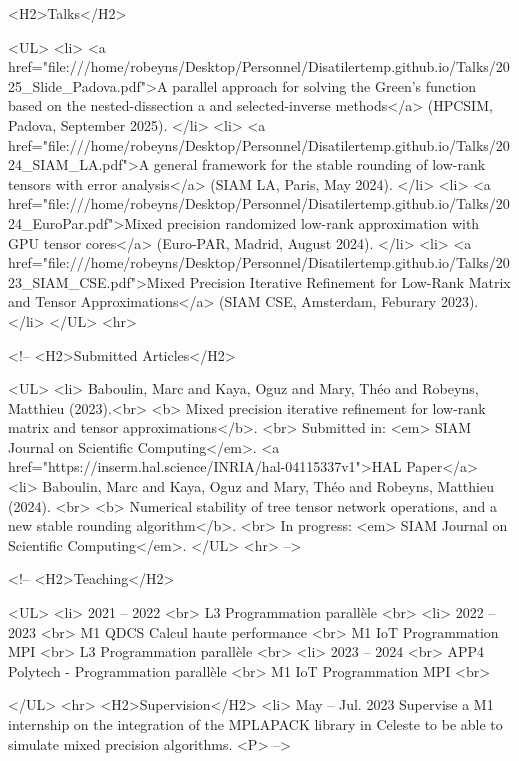                     <H2>Talks</H2>

                    <UL>
                        <li> <a href="file:///home/robeyns/Desktop/Personnel/Disatilertemp.github.io/Talks/2025_Slide_Padova.pdf">A parallel approach for solving the Green’s function based on the nested-dissection a and selected-inverse methods</a> (HPCSIM, Padova, September 2025). </li>
                        <li> <a href="file:///home/robeyns/Desktop/Personnel/Disatilertemp.github.io/Talks/2024_SIAM_LA.pdf">A general framework for the stable rounding of low-rank tensors with error analysis</a> (SIAM LA, Paris, May 2024). </li>
                        <li> <a href="file:///home/robeyns/Desktop/Personnel/Disatilertemp.github.io/Talks/2024_EuroPar.pdf">Mixed precision randomized low-rank approximation with GPU tensor cores</a> (Euro-PAR, Madrid, August 2024). </li>
                        <li> <a href="file:///home/robeyns/Desktop/Personnel/Disatilertemp.github.io/Talks/2023_SIAM_CSE.pdf">Mixed Precision Iterative Refinement for Low-Rank Matrix and Tensor Approximations</a> (SIAM CSE, Amsterdam, Feburary 2023). </li>
                    </UL>
                    <hr>

                    <!-- <H2>Submitted Articles</H2>

                    <UL>
                        <li> Baboulin, Marc and Kaya, Oguz and Mary, Théo and Robeyns, Matthieu (2023).<br> 
                            <b> Mixed precision iterative refinement for low-rank matrix and tensor approximations</b>. <br>
                            Submitted in: <em> SIAM Journal on Scientific Computing</em>. <a href="https://inserm.hal.science/INRIA/hal-04115337v1">HAL Paper</a>
                        <li> Baboulin, Marc and Kaya, Oguz and Mary, Théo and Robeyns, Matthieu (2024). <br>
                            <b> Numerical stability of tree tensor network operations, and a new stable rounding algorithm</b>. <br>
                            In progress: <em> SIAM Journal on Scientific Computing</em>.
                    </UL>
                    <hr> -->

<!-- <H2>Teaching</H2>

                    <UL>
                        <li> 2021 -- 2022 <br>
                            L3 Programmation parallèle <br>
                        <li> 2022 -- 2023 <br> 
                            M1 QDCS Calcul haute performance <br>
                            M1 IoT Programmation MPI <br>
                            L3 Programmation parallèle <br>
                        <li> 2023 -- 2024 <br> 
                            APP4 Polytech - Programmation parallèle <br>
                            M1 IoT Programmation MPI <br>
                            
                    </UL>
                    <hr>
                    <H2>Supervision</H2>
                        <li> May -- Jul. 2023 Supervise a M1 internship on the integration of the MPLAPACK library in Celeste to be able to simulate mixed precision algorithms.
                        <P> -->